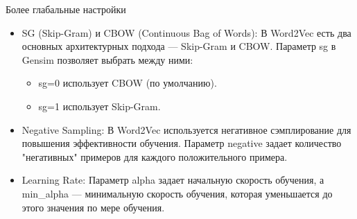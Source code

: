 			Более глабальные настройки
			\begin{itemize}
				\item SG (Skip-Gram) и CBOW (Continuous Bag of Words): В Word2Vec есть два основных архитектурных подхода — Skip-Gram и CBOW. Параметр sg в Gensim позволяет выбрать между ними:
					\begin{itemize}
						\item sg=0 использует CBOW (по умолчанию).
						\item sg=1 использует Skip-Gram.
					\end{itemize}
				\item Negative Sampling: В Word2Vec используется негативное сэмплирование для повышения эффективности обучения. Параметр negative задает количество "негативных" примеров для каждого положительного примера.
				\item Learning Rate: Параметр alpha задает начальную скорость обучения, а min\_alpha — минимальную скорость обучения, которая уменьшается до этого значения по мере обучения.
			\end{itemize}
		
